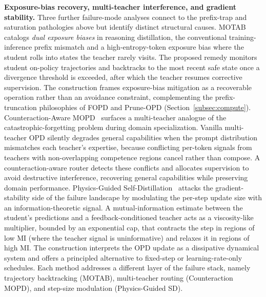\documentclass{article} %
\begin{document}
\textbf{Exposure-bias recovery, multi-teacher interference, and gradient stability.} Three further failure-mode analyses connect to the prefix-trap and saturation pathologies above but identify distinct structural causes. MOTAB~\citep{2605.19433} catalogs \emph{dual exposure biases} in reasoning distillation, the conventional training-inference prefix mismatch and a high-entropy-token exposure bias where the student rolls into states the teacher rarely visits. The proposed remedy monitors student on-policy trajectories and backtracks to the most recent safe state once a divergence threshold is exceeded, after which the teacher resumes corrective supervision. The construction frames exposure-bias mitigation as a recoverable operation rather than an avoidance constraint, complementing the prefix-truncation philosophies of FOPD and Prune-OPD (Section~\ref{subsec:compute}). Counteraction-Aware MOPD~\citep{2605.27115} surfaces a multi-teacher analogue of the catastrophic-forgetting problem during domain specialization. Vanilla multi-teacher OPD silently degrades general capabilities when the prompt distribution mismatches each teacher's expertise, because conflicting per-token signals from teachers with non-overlapping competence regions cancel rather than compose. A counteraction-aware router detects these conflicts and allocates supervision to avoid destructive interference, recovering general capabilities while preserving domain performance. Physics-Guided Self-Distillation~\citep{2606.03620} attacks the gradient-stability side of the failure landscape by modulating the per-step update size with an information-theoretic signal. A mutual-information estimate between the student's predictions and a feedback-conditioned teacher acts as a viscosity-like multiplier, bounded by an exponential cap, that contracts the step in regions of low MI (where the teacher signal is uninformative) and relaxes it in regions of high MI. The construction interprets the OPD update as a dissipative dynamical system and offers a principled alternative to fixed-step or learning-rate-only schedules. Each method addresses a different layer of the failure stack, namely trajectory backtracking (MOTAB), multi-teacher routing (Counteraction MOPD), and step-size modulation (Physics-Guided SD).
\end{document}
